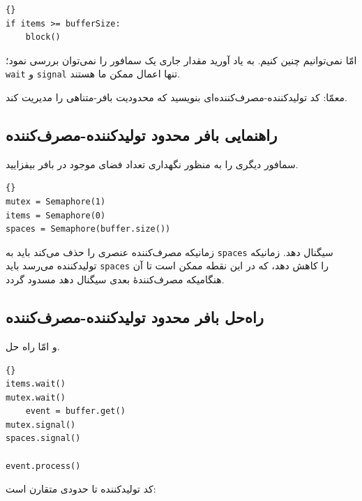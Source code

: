\documentclass{book}
\newcommand{\clearemptydoublepage}{\newpage\cleardoublepage}
\begin{document}
\begin{latin}
\begin{lstlisting}[title=\rl{راه‌حل معیوب بافر محدود}]{}
if items >= bufferSize:
    block()
\end{lstlisting}
\end{latin}

    امّا نمی‌توانیم چنین کنیم. به یاد آورید مقدار جاری یک سمافور را نمی‌توان بررسی نمود؛ {\tt wait} و {\tt signal} تنها  اعمال ممکن ما هستند. 
    
    معمّا: کد تولیدکننده-مصرف‌کننده‌ای بنویسید که محدودیت بافر-متناهی را مدیریت کند. 
    

\clearemptydoublepage
\subsection{ راهنمایی بافر محدود تولیدکننده-مصرف‌کننده }

    سمافور دیگری را به منظور نگهداری تعداد فضای موجود در بافر  بیفزایید. 
\begin{latin}
\begin{lstlisting}[title=\rl{مقداردهی اولیهٔ بافر محدود تولیدکننده-مصرف‌کننده}]{}
mutex = Semaphore(1)
items = Semaphore(0)
spaces = Semaphore(buffer.size())
\end{lstlisting}
\end{latin}

    زمانیکه مصرف‌کننده عنصری را حذف می‌کند باید به {\tt spaces} سیگنال دهد. 
    زمانیکه تولیدکننده می‌رسد باید {\tt spaces} را کاهش دهد، که در این نقطه ممکن است تا آن هنگامیکه مصرف‌کنندهٔ بعدی سیگنال دهد مسدود گردد. 


\clearemptydoublepage
\subsection{ راه‌حل بافر محدود تولیدکننده-مصرف‌کننده }

    و امّا راه حل. 

\begin{latin}
\begin{lstlisting}[title=\rl{راه‌حل  بافر محدود  مصرف‌کننده}]{}
items.wait()
mutex.wait()
    event = buffer.get()
mutex.signal()
spaces.signal()

event.process()
\end{lstlisting}
\end{latin}

    کد تولیدکننده  تا حدودی متقارن است: 
\end{document}

